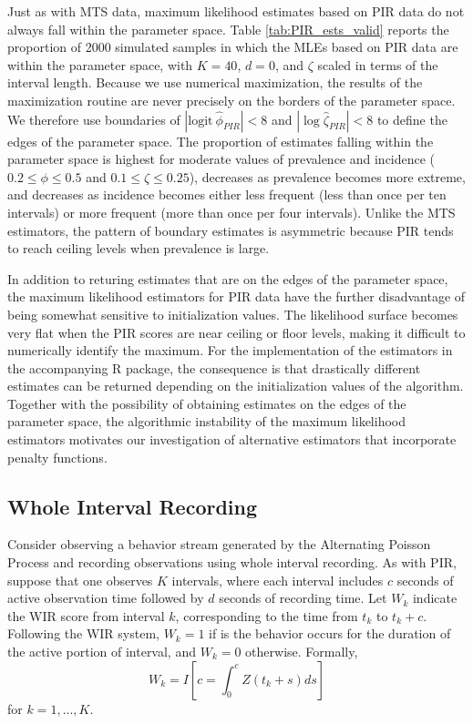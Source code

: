 \documentclass[man, noextraspace, floatsintext]{apa6}\usepackage[]{graphicx}\usepackage[]{color}
\newcommand{\logit}{\text{logit}}
\begin{document}
Just as with MTS data, maximum likelihood estimates based on PIR data do not always fall within the parameter space. 
Table \ref{tab:PIR_ests_valid} reports the proportion of 2000 simulated samples in which the MLEs based on PIR data are within the parameter space, with $K = 40$, $d = 0$, and $\zeta$ scaled in terms of the interval length.
Because we use numerical maximization, the results of the maximization routine are never precisely on the borders of the parameter space. 
We therefore use boundaries of $|\logit \ \hat\phi_{PIR}| < 8$ and $|\log \hat\zeta_{PIR}| < 8$ to define the edges of the parameter space. 
The proportion of estimates falling within the parameter space is highest for moderate values of prevalence and incidence ($0.2 \leq \phi \leq 0.5$ and $0.1 \leq \zeta \leq 0.25$), decreases as prevalence becomes more extreme, and decreases as incidence becomes either less frequent (less than once per ten intervals) or more frequent (more than once per four intervals).  
Unlike the MTS estimators, the pattern of boundary estimates is asymmetric because PIR tends to reach ceiling levels when prevalence is large. 

In addition to returing estimates that are on the edges of the parameter space, the maximum likelihood estimators for PIR data have the further disadvantage of being somewhat sensitive to initialization values. 
The likelihood surface becomes very flat when the PIR scores are near ceiling or floor levels, making it difficult to numerically identify the maximum. 
For the implementation of the estimators in the accompanying R package, the consequence is that drastically different estimates can be returned depending on the initialization values of the algorithm. 
Together with the possibility of obtaining estimates on the edges of the parameter space, the algorithmic instability of the maximum likelihood estimators motivates our investigation of alternative estimators that incorporate penalty functions.  

\subsection{Whole Interval Recording}
\label{sec:WIR}

Consider observing a behavior stream generated by the Alternating Poisson Process and recording observations using whole interval recording. 
As with PIR, suppose that one observes $K$ intervals, where each interval includes $c$ seconds of active observation time followed by $d$ seconds of recording time. 
Let $W_k$ indicate the WIR score from interval $k$, corresponding to the time from $t_k$ to $t_k + c$. 
Following the WIR system, $W_k = 1$ if is the behavior occurs for the duration of the active portion of interval, and $W_k = 0$ otherwise. 
Formally, 
\begin{equation}
W_k = I\left[ c = \int_0^c Z\left(t_k + s \right) ds\right]
\end{equation}
for $k = 1,...,K$. 
\end{document}
